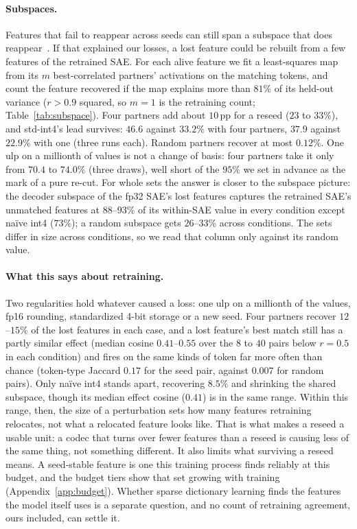 \documentclass{article}
\begin{document}
\paragraph{Subspaces.} Features that fail to reappear across seeds can
still span a subspace that does reappear~\citep{reprosubspaces}. If
that explained our losses, a lost feature could be rebuilt from a few
features of the retrained SAE. For each alive feature we fit a
least-squares map from its $m$ best-correlated partners' activations on
the matching tokens, and count the feature recovered if the map
explains more than $81\%$ of its held-out variance ($r > 0.9$ squared,
so $m = 1$ is the retraining count; Table~\ref{tab:subspace}). Four
partners add about $10$\,pp for a reseed ($23$ to $33\%$), and
std-int4's lead survives: $46.6$ against $33.2\%$ with four partners,
$37.9$ against $22.9\%$ with one (three runs each). Random partners
recover at most $0.12\%$. One ulp on a millionth of values is not a
change of basis: four partners take it only from $70.4$ to $74.0\%$
(three draws), well short of the $95\%$ we set in advance as the mark of
a pure re-cut. For whole sets the answer is closer to the subspace
picture: the decoder subspace of the fp32 SAE's lost features captures
the retrained SAE's unmatched features at $88$--$93\%$ of its
within-SAE value in every condition except na\"ive int4 ($73\%$); a
random subspace gets $26$--$33\%$ across conditions. The sets differ in size across
conditions, so we read that column only against its random value.

\paragraph{What this says about retraining.} Two regularities hold
whatever caused a loss: one ulp on a millionth of the values, fp16
rounding, standardized 4-bit storage or a new seed. Four partners
recover $12$--$15\%$ of the lost features in each case, and a lost
feature's best match still has a partly similar effect (median cosine
$0.41$--$0.55$ over the $8$ to $40$ pairs below $r = 0.5$ in each
condition) and fires on the same kinds of
token far more often than chance (token-type Jaccard $0.17$ for the
seed pair, against $0.007$ for random pairs). Only na\"ive int4 stands apart, recovering
$8.5\%$ and shrinking the shared subspace, though its median effect
cosine ($0.41$) is in the same range. Within this range, then, the
size of a perturbation sets how many features retraining relocates, not
what a relocated feature looks like. That is what makes a reseed a
usable unit: a codec that turns over fewer features than a reseed is
causing less of the same thing, not something different. It also limits
what surviving a reseed means. A seed-stable feature is one this
training process finds reliably at this budget, and the budget tiers
show that set growing with training (Appendix~\ref{app:budget}).
Whether sparse dictionary learning finds the features the model itself
uses is a separate question, and no count of retraining agreement, ours
included, can settle it.
\end{document}
